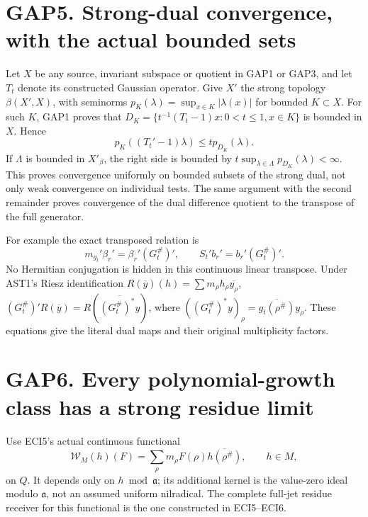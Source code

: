 \section{GAP5. Strong-dual convergence, with the actual bounded
sets}\label{gap5.-strong-dual-convergence-with-the-actual-bounded-sets}

Let \(X\) be any source, invariant subspace or quotient in GAP1 or GAP3,
and let \(T_t\) denote its constructed Gaussian operator. Give \(X'\)
the strong topology \(\beta(X',X)\), with seminorms
\(p_K(\lambda)=\sup_{x\in K}|\lambda(x)|\) for bounded \(K\subset X\).
For such \(K\), GAP1 proves that
\(D_K=\{t^{-1}(T_t-1)x:0<t\le1,x\in K\}\) is bounded in \(X\). Hence \[
p_K((T_t'-1)\lambda)\le t p_{D_K}(\lambda).
\tag{GAP5.1}
\] If \(\Lambda\) is bounded in \(X'_\beta\), the right side is bounded
by \(t\sup_{\lambda\in\Lambda}p_{D_K}(\lambda)<\infty\). This proves
convergence uniformly on bounded subsets of the strong dual, not only
weak convergence on individual tests. The same argument with the second
remainder proves convergence of the dual difference quotient to the
transpose of the full generator.

For example the exact transposed relation is \[
m_{g_t}'\beta_r'=\beta_r'(G_t^\#)',
\qquad S_t'b_r'=b_r'(G_t^\#)'.
\tag{GAP5.2}
\] No Hermitian conjugation is hidden in this continuous linear
transpose. Under AST1's Riesz identification
\(R(\overline y)(h)=\sum m_\rho h_\rho\overline{y_\rho}\),
\((G_t^\#)'R(\overline y)=R(\overline{(G_t^\#)^*y})\), where
\(((G_t^\#)^*y)_\rho=\overline{g_t(\rho^\#)}y_\rho\). These equations
give the literal dual maps and their original multiplicity factors.

\section{GAP6. Every polynomial-growth class has a strong residue
limit}\label{gap6.-every-polynomial-growth-class-has-a-strong-residue-limit}

Use ECI5's actual continuous functional \[
\mathcal W_M(h)(F)=\sum_\rho m_\rho F(\rho)\overline{h(\rho^\#)},
\qquad h\in M,
\tag{GAP6.1}
\] on \(Q\). It depends only on \(h\bmod\mathfrak a\); its additional
kernel is the value-zero ideal modulo \(\mathfrak a\), not an assumed
uniform nilradical. The complete full-jet residue receiver for this
functional is the one constructed in ECI5--ECI6.

